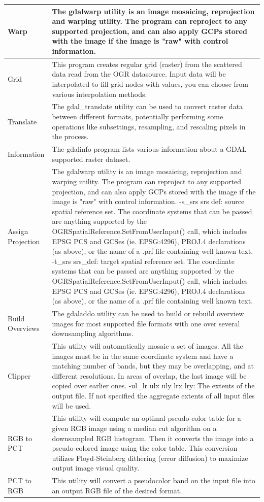 \begin{table}[ht]
\begin{tabular}{|l|p{4in}|}
\hline Warp & The gdalwarp utility is an image mosaicing, reprojection and warping utility. The program can reproject to any supported projection, and can also apply GCPs stored with the image if the image is "raw" with control information. \\
\hline Grid & This program creates regular grid (raster) from the scattered data read from the OGR datasource. Input data will be interpolated to fill grid nodes with values, you can choose from various interpolation methods.\\
\hline Translate & The gdal\_translate utility can be used to convert raster data between different formats, potentially performing some operations like subsettings, resampling, and rescaling pixels in the process.\\
\hline Information & The gdalinfo program lists various information about a GDAL supported raster dataset. \\
\hline Assign Projection &  The gdalwarp utility is an image mosaicing, reprojection and warping utility. The program can reproject to any supported projection, and can also apply GCPs stored with the image if the image is "raw" with control information.
-s\_srs srs def:
source spatial reference set. The coordinate systems that can be passed are anything supported by the OGRSpatialReference.SetFromUserInput() call, which includes EPSG PCS and GCSes (ie. EPSG:4296), PROJ.4 declarations (as above), or the name of a .prf file containing well known text. 
-t\_srs srs\_def:
target spatial reference set. The coordinate systems that can be passed are anything supported by the OGRSpatialReference.SetFromUserInput() call, which includes EPSG PCS and GCSes (ie. EPSG:4296), PROJ.4 declarations (as above), or the name of a .prf file containing well known text. \\
\hline Build Overviews &  The gdaladdo utility can be used to build or rebuild overview images for most supported file formats with one over several downsampling algorithms.\\
\hline Clipper & This utility will automatically mosaic a set of images. All the images must be in the same coordinate system and have a matching number of bands, but they may be overlapping, and at different resolutions. In areas of overlap, the last image will be copied over earlier ones. 
-ul\_lr ulx uly lrx lry:
The extents of the output file. If not specified the aggregate extents of all input files will be used. \\
\hline RGB to PCT &  This utility will compute an optimal pseudo-color table for a given RGB image using a median cut algorithm on a downsampled RGB histogram. Then it converts the image into a pseudo-colored image using the color table. This conversion utilizes Floyd-Steinberg dithering (error diffusion) to maximize output image visual quality. \\
\hline PCT to RGB &  This utility will convert a pseudocolor band on the input file into an output RGB file of the desired format.\\

\end{tabular}
\end{table}

